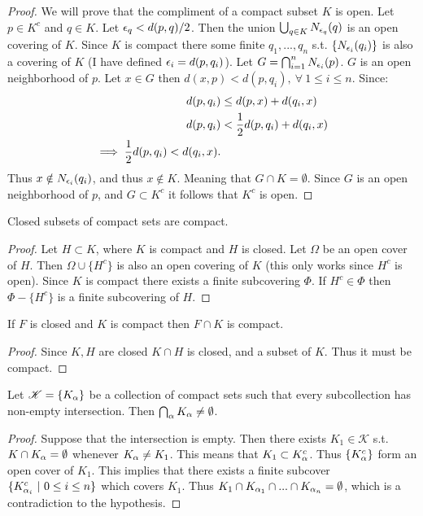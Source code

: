 \begin{proof}
  We will prove that the compliment of a compact subset $K$ is open. Let $p\in K^c$ and $q\in K$. Let $\epsilon_q < d(p,q)/2$. Then the union $\bigcup_{q\in K} N_{\epsilon_q}(q)$ is an open covering of $K$. Since $K$ is compact there some finite $q_1,...,q_n$ s.t. $\{N_{\epsilon_i}(q_i)\}$ is also a covering of $K$ (I have defined $\epsilon_i = d(p,q_i)$). Let $G = \bigcap_{i = 1}^n N_{\epsilon_i}(p)$. $G$ is an open neighborhood of $p$. Let $x\in G$ then $d(x,p)<d(p,q_i),\ \forall\ 1\leq i\leq n$. Since:
  \begin{align*}
    d(p,q_i) &\leq d(p,x) + d(q_i,x)\\
    d(p,q_i) &< \frac{1}{2}d(p,q_i) + d(q_i,x)\\
    \implies \frac{1}{2}d(p,q_i) < d(q_i,x).
  \end{align*}
  Thus $x\notin N_{\epsilon_i}(q_i)$, and thus $x\notin K$. Meaning that $G\cap K = \emptyset$. Since $G$ is an open neighborhood of $p$, and $G\subset K^c$ it follows that $K^c$ is open.
\end{proof}
\begin{proposition}
  Closed subsets of compact sets are compact.
\end{proposition}
\begin{proof}
  Let $H\subset K$, where $K$ is compact and $H$ is closed. Let $\Omega$ be an open cover of $H$. Then $\Omega \cup \{H^c\}$ is also an open covering of $K$ (this only works since $H^c$ is open). Since $K$ is compact there exists a finite subcovering $\Phi$. If $H^c \in \Phi$ then $\Phi - \{H^c\}$ is a finite subcovering of $H$.
\end{proof}
\begin{corollary}
  If $F$ is closed and $K$ is compact then $F\cap K$ is compact.
\end{corollary}
\begin{proof}
  Since $K,H$ are closed $K\cap H$ is closed, and a subset of $K$. Thus it must be compact.
\end{proof}
\begin{proposition}
  Let $ \mathscr{K} = \{K_\alpha\}$ be a collection of compact sets such that every subcollection has non-empty intersection. Then $\bigcap_{\alpha} K_\alpha \neq \emptyset$.
\end{proposition}
\begin{proof}
  Suppose that the intersection is empty. Then there exists $K_1\in \mathscr{K}$ s.t. $K\cap K_\alpha = \emptyset$ whenever $K_\alpha\neq K_1$. This means that $K_1 \subset K^c_\alpha$. Thus $\{K^c_\alpha\}$ form an open cover of $K_1$. This implies that there exists a finite subcover $\{K^c_{\alpha_i}\ |\ 0 \leq i\leq n\}$ which covers $K_1$. Thus $K_1 \cap K_{\alpha_1} \cap ... \cap K_{\alpha_n} = \emptyset$, which is a contradiction to the hypothesis.
\end{proof}
